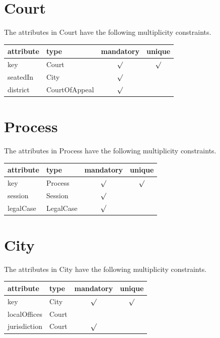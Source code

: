 \documentclass[10pt,a4paper]{report}              %
\theoremstyle{plain}\theorembodyfont{\rmfamily}\newtheorem{definition}{Definition}[section]
\theoremstyle{plain}\theorembodyfont{\rmfamily}\newtheorem{designrule}[definition]{Requirement}
\begin{document}
\section{Court}

\label{sct:plug Court}

The attributes in Court have the following multiplicity constraints. 

\begin{center}
\begin{tabular}{llcc}
attribute & type & mandatory & unique\\
\hline
key  & Court & $\surd$ & $\surd$\\
seatedIn & City & $\surd$ & \\
district & CourtOfAppeal & $\surd$ & \\
\end{tabular}
\end{center}

\section{Process}

\label{sct:plug Process}

The attributes in Process have the following multiplicity constraints. 

\begin{center}
\begin{tabular}{llcc}
attribute & type & mandatory & unique\\
\hline
key  & Process & $\surd$ & $\surd$\\
session & Session & $\surd$ & \\
legalCase & LegalCase & $\surd$ & \\
\end{tabular}
\end{center}

\section{City}

\label{sct:plug City}

The attributes in City have the following multiplicity constraints. 

\begin{center}
\begin{tabular}{llcc}
attribute & type & mandatory & unique\\
\hline
key  & City & $\surd$ & $\surd$\\
localOffices & Court &  & \\
jurisdiction & Court & $\surd$ & \\
\end{tabular}
\end{center}
\end{document}
